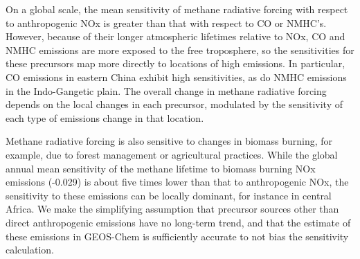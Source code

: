 
On a global scale, the mean sensitivity of methane radiative forcing with respect to anthropogenic NOx is greater than that with respect to CO or NMHC's. However, because of their longer atmospheric lifetimes relative to NOx, CO and NMHC emissions are more exposed to the free troposphere, so the sensitivities for these precursors map more directly to locations of high emissions. In particular, CO emissions in eastern China exhibit high sensitivities, as do NMHC emissions in the Indo-Gangetic plain. The overall change in methane radiative forcing depends on the local changes in each precursor, modulated by the sensitivity of each type of emissions change in that location.


Methane radiative forcing is also sensitive to changes in biomass burning, for example, due to forest management or agricultural practices. While the global annual mean sensitivity of the methane lifetime to biomass burning NOx emissions (-0.029) is about five times lower than that to anthropogenic NOx, the sensitivity to these emissions can be locally dominant, for instance in central Africa. We make the simplifying assumption that precursor sources other than direct anthropogenic emissions have no long-term trend, and that the estimate of these emissions in GEOS-Chem is sufficiently accurate to not bias the sensitivity calculation.

